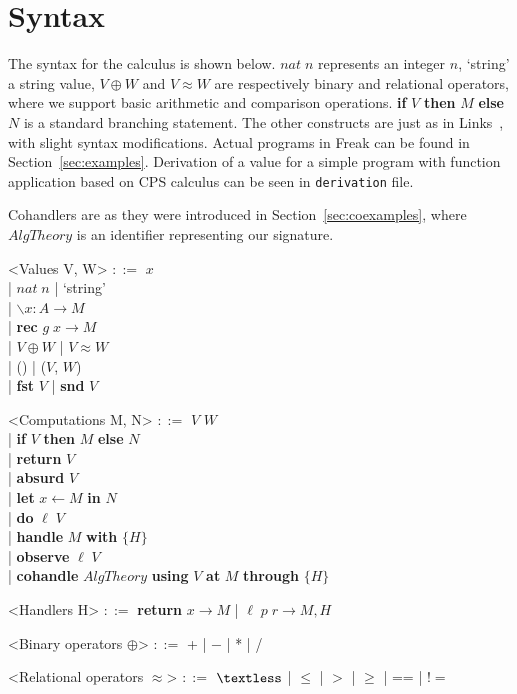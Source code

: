 \documentclass[declaration,shortabstract]{iithesis}
\theoremstyle{definition} \newtheorem{definition}{Definition}[chapter]
\theoremstyle{remark} \newtheorem{remark}[definition]{Observation}
\theoremstyle{plain} \newtheorem{theorem}[definition]{Theorem}
\theoremstyle{plain} \newtheorem{lemma}[definition]{Lemma}
\begin{document}
\section{Syntax}

    The syntax for the calculus is shown below. $nat \; n$ represents an integer $n$,
    `string' a string value, $V \oplus W$ and $V \approx W$ are respectively
    binary and relational operators, where we support basic arithmetic and
    comparison operations. \textbf{if} $V$ \textbf{then} $M$ \textbf{else} $N$
    is a standard branching statement. The other constructs are just as in
    Links~\cite{handlers-cps-journal}, with slight syntax modifications.
    Actual programs in Freak can be found in Section~\ref{sec:examples}.
    Derivation of a value for a simple program with function application based
    on CPS calculus can be seen in \verb!derivation! file.

    Cohandlers are as they were introduced in Section~\ref{sec:coexamples},
    where $AlgTheory$ is an identifier representing our signature.

    \begin{grammar}

        <Values V, W> $::=$ $ x $ \\
            | $nat \; n$ | `string'  \\
            | $ \backslash x : A \rightarrow M $ \\
            | \textbf{rec} $ g \; x \rightarrow M $\\
            | $V \oplus W$ | $V \approx W$ \\
            | () | ($V$, $W$) \\
            | \textbf{fst} $V$ | \textbf{snd} $V$

        <Computations M, N> $::=$ $ V $ $ W $ \\
            | \textbf{if} $V$ \textbf{then} $M$ \textbf{else} $N$ \\
            | \textbf{return} $V$ \\
            | \textbf{absurd} $ V $ \\
            | \textbf{let} $ x \leftarrow M $ \textbf{in} $ N $ \\
            | \textbf{do} $\ell \; V$ \\
            | \textbf{handle} $M$ \textbf{with} $ \{ H \} $ \\
            | \textbf{observe} $\ell \; V$ \\
            | \textbf{cohandle} $AlgTheory$ \textbf{using} $V$ \textbf{at} $M$ \textbf{through} $ \{ H \} $

        <Handlers H> $::=$ \textbf{return} $ x \rightarrow M $ | $ \ell \; p \; r \rightarrow M, H $

        <Binary operators $\oplus$> $::=$ + | $-$ | * | /

        <Relational operators $\approx$> $::=$ $ \textless $ | $\leqslant$ | $>$ | $\geqslant$ | == | $!= $

    \end{grammar}
\end{document}
